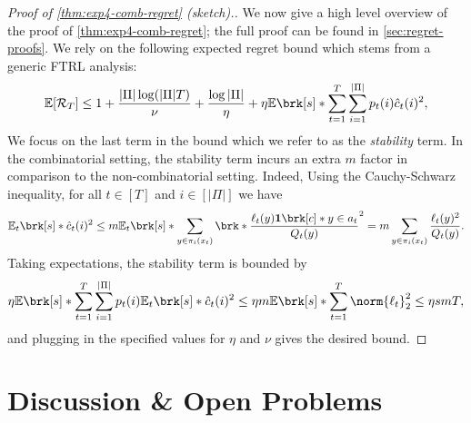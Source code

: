 \documentclass[11pt]{article}
\newcommand{\bbE}{\boldsymbol{\mathbb{E}}}
\renewcommand{\E}{\bbE}
\newcommand{\pred}{a}
\newcommand{\lab}{y}
\newcommand{\regret}{\mathcal{R}}
\theoremstyle{plain}
\begin{document}
\begin{proof}[Proof of \cref{thm:exp4-comb-regret} (sketch).] We now give a high level overview of the proof of \cref{thm:exp4-comb-regret}; the full proof can be found in \cref{sec:regret-proofs}. We rely on the following expected regret bound which stems from a generic FTRL analysis: 
\begin{align*}
    \E[\regret_T] \leq 1 + \frac{|\Pi| \log (|\Pi|T)}{\nu} + \frac{\log |\Pi|}{\eta} + \eta \E \brk[s]*{\sum_{t=1}^T \sum_{i=1}^{|\Pi|}  p_t(i)\hat c_t(i)^2},
\end{align*}
We focus on the last term in the bound which we refer to as the \emph{stability} term. In the combinatorial setting, the stability term incurs an extra $m$ factor in comparison to the non-combinatorial setting. Indeed, Using the Cauchy-Schwarz inequality, for all $t \in [T]$ and $i \in [|\Pi|]$ we have
\begin{align*}
    \E_t \brk[s]*{\hat c_t(i)^2} \leq m \E_t \brk[s]*{\sum_{\lab \in \pi_i(x_t)} \brk*{\frac{\ell_t(\lab) \mathbf{1} \brk[c]*{\lab \in \pred_t}}{Q_t(\lab)}}^2} 
    =
    m \sum_{\lab \in \pi_i(x_t)} \frac{\ell_t(\lab)^2}{Q_t(\lab)}.
\end{align*}
Taking expectations, the stability term is bounded by
\begin{align*}
    \eta \E \brk[s]*{\sum_{t=1}^T \sum_{i=1}^{|\Pi|}  p_t(i) \E_t \brk[s]*{ \hat c_t(i)^2 }}
    \leq 
    \eta m \E \brk[s]*{\sum_{t=1}^T \norm{\ell_t}_2^2}
    \leq \eta s m T,
\end{align*}
and plugging in the specified values for $\eta$ and $\nu$ gives the desired bound.
\end{proof}






\section{Discussion \& Open Problems}
\label{sec:discussion}
\end{document}

